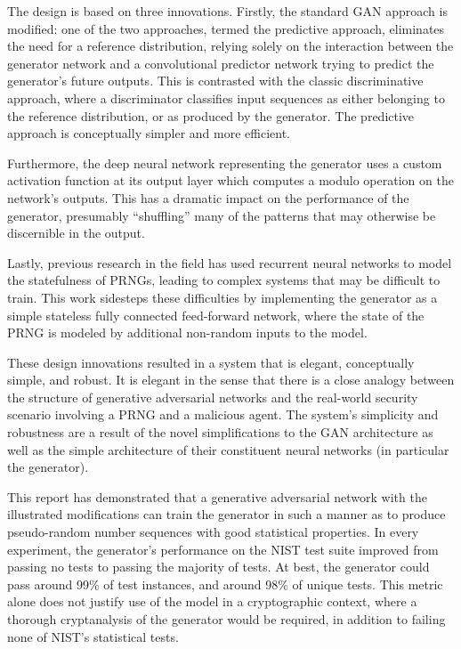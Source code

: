 \documentclass[12pt, titlepage]{report}
\theoremstyle{definition}
\begin{document}
The design is based on three innovations. Firstly, the standard GAN approach is modified: one of the two approaches, termed the predictive approach, eliminates the need for a reference distribution, relying  solely on the interaction between the generator network and a convolutional predictor network trying to predict the generator's future outputs. This is contrasted with the classic discriminative approach, where a discriminator classifies input sequences as either belonging to the reference distribution, or as produced by the generator. The predictive approach is conceptually simpler and more efficient.

Furthermore, the deep neural network representing the generator uses a custom activation function at its output layer which computes a modulo operation on the network's outputs. This has a dramatic impact on the performance of the generator, presumably ``shuffling'' many of the patterns that may otherwise be discernible in the output.

Lastly, previous research in the field has used recurrent neural networks to model the statefulness of PRNGs, leading to complex systems that may be difficult to train. This work sidesteps these difficulties by implementing the generator as a simple stateless fully connected feed-forward network, where the state of the PRNG is modeled by additional non-random inputs to the model.

These design innovations resulted in a system that is elegant, conceptually simple, and robust. It is elegant in the sense that there is a close analogy between the structure of generative adversarial networks and the real-world security scenario involving a PRNG and a malicious agent. The system's simplicity and robustness are a result of the novel simplifications to the GAN architecture as well as the simple architecture of their constituent neural networks (in particular the generator).

This report has demonstrated that a generative adversarial network with the illustrated modifications can train the generator in such a manner as to produce pseudo-random number sequences with good statistical properties. In every experiment, the generator's performance on the NIST test suite improved from passing no tests to passing the majority of tests. At best, the generator could pass around 99\% of test instances, and around 98\% of unique tests. This metric alone does not justify use of the model in a cryptographic context, where a thorough cryptanalysis of the generator would be required, in addition to failing none of NIST's statistical tests.
\end{document}
